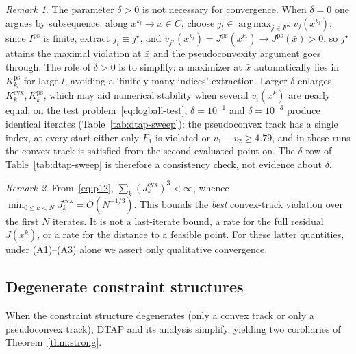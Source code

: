 \documentclass[]{interact}
\theoremstyle{plain}
\theoremstyle{definition}
\theoremstyle{remark}
\newtheorem{remark}{Remark}
\DeclareMathOperator*{\argmax}{arg\,max}
\newcommand{\cvx}{\mathrm{cvx}}
\newcommand{\ps}{\mathrm{ps}}
\newcommand{\dtap}{\textsc{DTAP}}
\begin{document}
\begin{remark}\label{rem:delta-role}
The parameter $\delta>0$ is not necessary for convergence. When $\delta=0$ one argues by
subsequence: along $x^{k_l}\to\bar x\in C$, choose
$j_l\in\argmax_{j\in I^{\ps}}v_j(x^{k_l})$; since $I^{\ps}$ is finite, extract
$j_l\equiv j^\star$, and $v_{j^\star}(x^{k_l})=J^{\ps}(x^{k_l})\to J^{\ps}(\bar x)>0$, so
$j^\star$ attains the maximal violation at $\bar x$ and the pseudoconvexity argument
goes through. The role of $\delta>0$ is to simplify: a maximizer at $\bar x$ automatically
lies in $K^{\ps}_{k_l}$ for large $l$, avoiding a `finitely many indices' extraction.
Larger $\delta$ enlarges $K^{\cvx}_k,K^{\ps}_k$, which may aid numerical stability when several
$v_i(x^k)$ are nearly equal; on the test problem~\eqref{eq:logball-test}, $\delta=10^{-1}$ and $\delta=10^{-3}$ produce identical iterates
(Table~\ref{tab:dtap-sweep}): the pseudoconvex track has a single index, at every start either only $F_1$ is violated
or $v_1-v_2\ge4.79$, and in these runs the convex track is satisfied from the second evaluated point on. The $\delta$ row
of Table~\ref{tab:dtap-sweep} is therefore a consistency check, not evidence about $\delta$.
\end{remark}

\begin{remark}\label{rem:rate}
From~\eqref{eq:p12}, $\sum_k(J^{\cvx}_k)^3<\infty$, whence
$\min_{0\le k<N}J^{\cvx}_k=O(N^{-1/3})$. This bounds the \emph{best} convex-track violation
over the first $N$ iterates. It is not a last-iterate bound, a rate for the full residual
$J(x^k)$, or a rate for the distance to a feasible point. For these latter quantities,
under (A1)--(A3) alone we assert only qualitative convergence.
\end{remark}

\subsection{Degenerate constraint structures}\label{ssec:degenerate}
When the constraint structure degenerates (only a convex track or only a pseudoconvex
track), \dtap{} and its analysis simplify, yielding two corollaries of
Theorem~\ref{thm:strong}.
\end{document}
